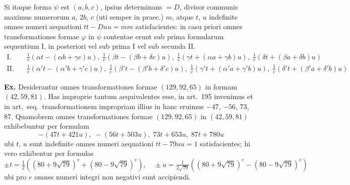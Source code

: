 \documentclass[12pt,a4paper]{article}
\theoremstyle{plain}
\theoremstyle{definition}
\theoremstyle{remark}
\begin{document}
Si itaque forma $\psi$ est $(a,b,c)$, ipsius determinans $=D$, divisor communis maximus numerorum $a$, $2b$, $c$ (uti semper in praec.) $m$, atque $t$, $u$ indefinite omnes numeri aequationi $tt-Duu=mm$ satisfacientes: in casu priori omnes transformationes formae $\varphi$ in $\psi$ contentae erunt sub prima formularum sequentium I, in posteriori vel sub prima I vel sub secunda II.
\begin{align*}
\text{I.} &\quad \tfrac{1}{e}(\alpha t-(\alpha b+\gamma c)u),\; \tfrac{1}{e}(\beta t-(\beta b+\delta c)u),\; \tfrac{1}{e}(\gamma t+(\alpha a+\gamma b)u),\; \tfrac{1}{e}(\delta t+(\beta a+\delta b)u) \\
\text{II.} &\quad \tfrac{1}{e}(\alpha' t-(\alpha' b+\gamma' c)u),\; \tfrac{1}{e}(\beta' t-(\beta' b+\delta' c)u),\; \tfrac{1}{e}(\gamma' t+(\alpha' a+\gamma' b)u),\; \tfrac{1}{e}(\delta' t+(\beta' a+\delta' b)u)
\end{align*}

\textbf{Ex.}
Desiderantur omnes transformationes formae $(129,92,65)$ in formam $(42,59,81)$. Has improprie tantum aequivalentes esse, in art.\ 195 invenimus et in art.\ seq.\ transformationem impropriam illius in hanc eruimus $-47$, $-56$, $73$, $87$. Quamobrem omnes transformationes formae $(129,92,65)$ in $(42,59,81)$ exhibebuntur per formulam
\[
-(47t+421u),\; -(56t+503u),\; 73t+653u,\; 87t+780u
\]
ubi $t$, $u$ sunt indefinite omnes numeri aequationi $tt-79uu=1$ satisfacientes; hi vero exhibentur per formulas
\[
\pm t = \tfrac{1}{2}((80+9\sqrt{79})^e + (80-9\sqrt{79})^e),\quad
\pm u = \tfrac{1}{2\sqrt{79}}((80+9\sqrt{79})^e - (80-9\sqrt{79})^e)
\]
ubi pro $e$ omnes numeri integri non negativi sunt accipiendi.
\end{document}
